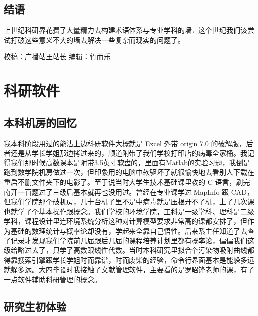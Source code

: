 \documentclass[
]{book}
\begin{document}
\hypertarget{ux7ed3ux8bed-18}{%
\subsection{结语}\label{ux7ed3ux8bed-18}}

上世纪科研界花费了大量精力去构建术语体系与专业学科的墙，这个世纪我们该尝试打破这些意义不大的墙去解决一些复杂而现实的问题了。

校稿：广播站王站长
编辑：竹而乐

\hypertarget{ux79d1ux7814ux8f6fux4ef6}{%
\section{科研软件}\label{ux79d1ux7814ux8f6fux4ef6}}

\hypertarget{ux672cux79d1ux673aux623fux7684ux56deux5fc6}{%
\subsection{本科机房的回忆}\label{ux672cux79d1ux673aux623fux7684ux56deux5fc6}}

我本科阶段用过的能沾上边科研软件大概就是 Excel 外带 origin 7.0 的破解版，后者还是从学长学姐那边拷过来的，顺道附带了我们学校打印店的病毒全家桶。我记得我们那时候高数课本是附带3.5英寸软盘的，里面有Matlab的实验习题，我倒是跑到数学院机房做过一次，但印象用的电脑中软驱坏了就很愉快地去看别人下载在重启不删文件夹下的电影了。至于说当时大学生技术基础课里教的 C 语言，刷完南开一百题过了三级后基本就再也没用过。曾经在专业课学过 MapInfo 跟 CAD，但我们学院那个破机房，几十台机子里不是中病毒就是压根开不了机，上了几次课也就学了个基本操作跟概念。我们学校的环境学院，工科是一级学科、理科是二级学科，课程设计里连环境系统分析这种对计算模型要求非常高的课都安排了，但作为基础的数理统计与概率论却没有，学起来全靠自己悟性。后来系主任知道了去查了记录才发现我们学院前几届跟后几届的课程培养计划里都有概率论，偏偏我们这级给略过去了，只学了高数跟线性代数。当时本科研究里拟合个污染物吸附曲线都得靠搜索引擎跟学长学姐时而靠谱，时而废柴的经验，命令行界面基本是能躲多远就躲多远。大四毕设时我接触了文献管理软件，主要看的是罗昭锋老师的课，有了一点软件辅助科研管理的概念。

\hypertarget{ux7814ux7a76ux751fux521dux4f53ux9a8c}{%
\subsection{研究生初体验}\label{ux7814ux7a76ux751fux521dux4f53ux9a8c}}
\end{document}
